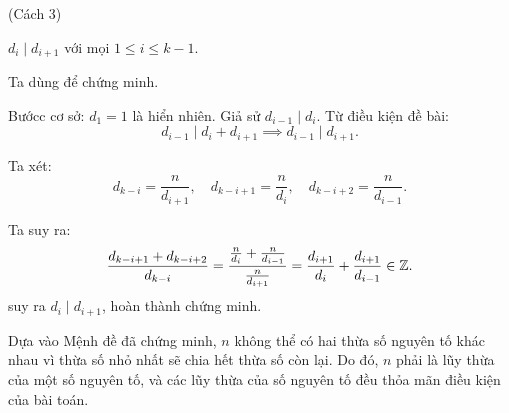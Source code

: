 \documentclass[../01-divisibility.tex]{subfiles}
\begin{document}
\begin{soln}(Cách 3)\footnotemark[\value{footnote}]
    \begin{claim*}
        \( d_i \mid d_{i+1} \) với mọi \( 1 \leq i \leq k-1 \).
    \end{claim*}
    \begin{subproof}
        Ta dùng  để chứng minh.
        
        Bướcc cơ sở: \( d_1 = 1 \) là hiển nhiên. Giả sử \( d_{i-1} \mid d_i \). Từ điều kiện đề bài:
        \[
            d_{i-1} \mid d_i + d_{i+1} \implies d_{i-1} \mid d_{i+1}.
        \]
        
        Ta xét:
        \[
            d_{k-i} = \frac{n}{d_{i+1}}, \quad d_{k-i+1} = \frac{n}{d_i}, \quad d_{k-i+2} = \frac{n}{d_{i-1}}.
        \]
        
        Ta suy ra:
        \[
            \frac{d_{k-i+1} + d_{k-i+2}}{d_{k-i}} = \frac{\frac{n}{d_i} + \frac{n}{d_{i-1}}}{\frac{n}{d_{i+1}}} = \frac{d_{i+1}}{d_i} + \frac{d_{i+1}}{d_{i-1}} \in \mathbb Z.
        \]
        suy ra \( d_i \mid d_{i+1} \), hoàn thành chứng minh.
    \end{subproof}

    Dựa vào Mệnh đề đã chứng minh, \( n \) không thể có hai thừa số nguyên tố khác nhau vì thừa số nhỏ nhất sẽ chia hết thừa số còn lại.
    Do đó, \( n \) phải là lũy thừa của một số nguyên tố, và các lũy thừa của số nguyên tố đều thỏa mãn điều kiện của bài toán.
\end{soln}

\end{document}
